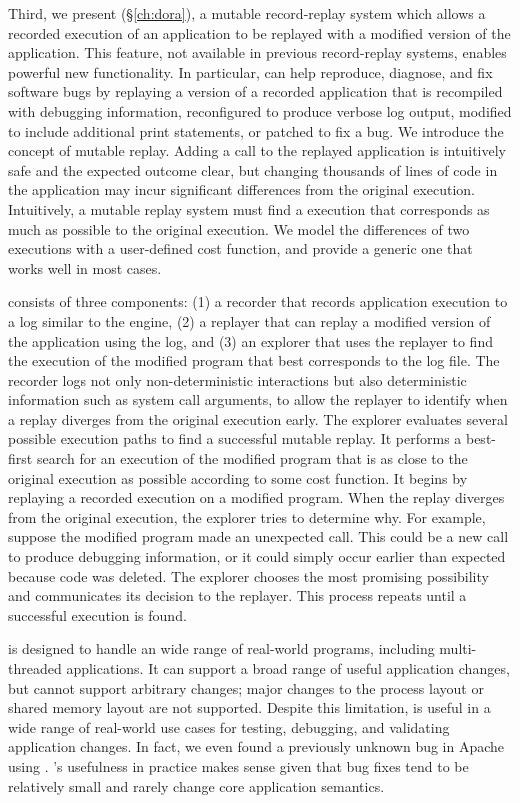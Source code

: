 Third, we present \dora (\S\ref{ch:dora}), a mutable record-replay system which
allows a recorded execution of an application to be replayed with a modified
version of the application. This feature, not available in previous
record-replay systems, enables powerful new functionality. In particular, \dora
can help reproduce, diagnose, and fix software bugs by replaying a version of a
recorded application that is recompiled with debugging information, reconfigured
to produce verbose log output, modified to include additional print statements,
or patched to fix a bug.
We introduce the concept of mutable replay. Adding a  call
to the replayed application is intuitively safe and the expected outcome clear,
but changing thousands of lines of code in the application may incur significant
differences from the original execution. Intuitively, a mutable replay system
must find a execution that corresponds as much as possible to the original
execution. We model the differences of two executions with a user-defined cost
function, and provide a generic one that works well in most cases.

\dora consists of three components: (1) a recorder that records application
execution to a log similar to the \scribe engine, (2) a replayer that can replay
a modified version of the application using the log, and (3) an explorer that
uses the replayer to find the execution of the modified program that best
corresponds to the log file. The recorder logs not only non-deterministic
interactions but also deterministic information such as system call arguments,
to allow the replayer to identify when a replay diverges from the original
execution early.
The explorer evaluates several possible execution paths to find a successful
mutable replay. It performs a best-first search for an execution of
the modified program that is as close to the original execution as
possible according to some cost function. It begins by replaying a
recorded execution on a modified program. When the replay diverges
from the original execution, the explorer tries to determine
why. For example, suppose the modified program made an unexpected
 call. This could be a new call to produce debugging
information, or it could simply occur earlier than expected because
code was deleted. The explorer chooses the most promising possibility
and communicates its decision to the replayer. This process repeats
until a successful execution is found.

{\dora} is designed to handle an wide range of real-world programs, including
multi-threaded applications. It can support a broad range of useful application
changes, but cannot support arbitrary changes; major changes to the process
layout or shared memory layout are not supported. Despite this limitation,
{\dora} is useful in a wide range of real-world use cases for testing,
debugging, and validating application changes. In fact, we even found a
previously unknown bug in Apache using {\dora}. {\dora}'s usefulness in practice
makes sense given that bug fixes tend to be relatively small and rarely change
core application semantics.

